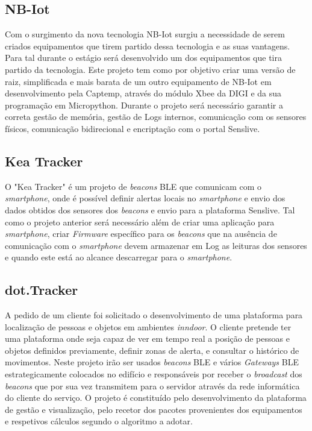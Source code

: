 \subsection{NB-Iot}
Com o surgimento da nova tecnologia NB-Iot surgiu a necessidade de serem criados equipamentos que tirem partido dessa tecnologia e as suas vantagens. Para tal durante o estágio será desenvolvido um dos equipamentos que tira partido da tecnologia. Este projeto tem como por objetivo criar uma versão de raiz, simplificada e mais barata de um outro equipamento de NB-Iot em desenvolvimento pela Captemp, através do módulo Xbee da DIGI e da sua programação em Micropython. Durante o projeto será necessário garantir a correta gestão de memória, gestão de Logs internos, comunicação com os sensores físicos, comunicação bidirecional e encriptação com o portal Senslive.
\subsection{Kea Tracker}
O "Kea Tracker" é um projeto de \textit{beacons} BLE que comunicam com o \textit{smartphone}, onde é possível definir alertas locais no \textit{smartphone} e envio dos dados obtidos dos sensores dos \textit{beacons} e envio para a plataforma Senslive.
Tal como o projeto anterior será necessário além de criar uma aplicação para \textit{smartphone}, criar \textit{Firmware} específico para os \textit{beacons} que na ausência de comunicação com o \textit{smartphone} devem armazenar em Log as leituras dos sensores e quando este está ao alcance descarregar para o \textit{smartphone}.
\subsection{dot.Tracker}
A pedido de um cliente foi solicitado o desenvolvimento de uma plataforma para localização de pessoas e objetos em ambientes \textit{inndoor}. O cliente pretende ter uma plataforma onde seja capaz de ver em tempo real a posição de pessoas e objetos definidos previamente, definir zonas de alerta, e consultar o histórico de movimentos. Neste projeto irão ser usados \textit{beacons} BLE e vários \textit{Gateways} BLE estrategicamente colocados no edifício e responsáveis por receber o \textit{broadcast} dos \textit{beacons} que por sua vez transmitem para o servidor através da rede informática do cliente do serviço. O projeto é constituído pelo desenvolvimento da plataforma de gestão e visualização, pelo recetor dos pacotes provenientes dos equipamentos e respetivos cálculos segundo o algoritmo a adotar.

